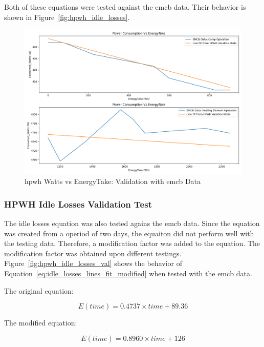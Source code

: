 Both of these equations were tested against the \gls{emcb} data. Their behavior is shown in Figure~\ref{fig:hpwh_idle_losses}.

\begin{figure}[htp!]
    \centering
    \includegraphics[width=0.9\columnwidth]{Pictures/w_wh_validation.png}
    \caption{\gls{hpwh} Watts vs EnergyTake: Validation with \gls{emcb} Data}
    \label{fig:hpwh_idle_l_osses}
\end{figure}
\newpage
\subsubsection{HPWH Idle Losses Validation Test}
The idle losses equation was also tested agains the \gls{emcb} data. Since the equation was created from a operiod of two days, the equaiton did not perform well with the testing data. Therefore, a modification factor was added to the equation. The modification factor was obtained upon different testings. Figure~\ref{fig:hpwh_idle_losses_val} shows the behavior of Equation~\ref{eq:idle_losses_lines_fit_modified} when tested with the \gls{emcb} data.

The original equation:

\begin{equation}\label{eq:idle_losses_lines_fit_original}
    E(time) = 0.4737 \times time + 89.36
\end{equation}

The modified equation:

\begin{equation}\label{eq:idle_losses_lines_fit_modified}
    E(time) = 0.8960 \times time + 126
\end{equation}

